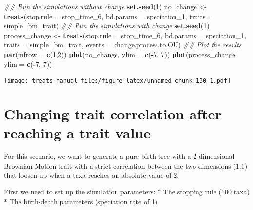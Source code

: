 \documentclass[
]{book}
\newenvironment{Shaded}{\begin{snugshade}}{\end{snugshade}}
\newcommand{\CommentTok}[1]{\textcolor[rgb]{0.56,0.35,0.01}{\textit{#1}}}
\newcommand{\DataTypeTok}[1]{\textcolor[rgb]{0.13,0.29,0.53}{#1}}
\newcommand{\DecValTok}[1]{\textcolor[rgb]{0.00,0.00,0.81}{#1}}
\newcommand{\KeywordTok}[1]{\textcolor[rgb]{0.13,0.29,0.53}{\textbf{#1}}}
\newcommand{\NormalTok}[1]{#1}
\newcommand{\OperatorTok}[1]{\textcolor[rgb]{0.81,0.36,0.00}{\textbf{#1}}}
\newcommand{\StringTok}[1]{\textcolor[rgb]{0.31,0.60,0.02}{#1}}
\begin{document}
\begin{Shaded}
\begin{Highlighting}[]
\CommentTok{\#\# Run the simulations without change}
\KeywordTok{set.seed}\NormalTok{(}\DecValTok{1}\NormalTok{)}
\NormalTok{no\_change \textless{}{-}}\StringTok{ }\KeywordTok{treats}\NormalTok{(}\DataTypeTok{stop.rule =}\NormalTok{ stop\_time\_}\DecValTok{6}\NormalTok{,}
                  \DataTypeTok{bd.params =}\NormalTok{ speciation\_}\DecValTok{1}\NormalTok{,}
                  \DataTypeTok{traits    =}\NormalTok{ simple\_bm\_trait)}
\CommentTok{\#\# Run the simulations with change}
\KeywordTok{set.seed}\NormalTok{(}\DecValTok{1}\NormalTok{)}
\NormalTok{process\_change \textless{}{-}}\StringTok{ }\KeywordTok{treats}\NormalTok{(}\DataTypeTok{stop.rule =}\NormalTok{ stop\_time\_}\DecValTok{6}\NormalTok{,}
                       \DataTypeTok{bd.params =}\NormalTok{ speciation\_}\DecValTok{1}\NormalTok{,}
                       \DataTypeTok{traits    =}\NormalTok{ simple\_bm\_trait,}
                       \DataTypeTok{events    =}\NormalTok{ change.process.to.OU)}
\CommentTok{\#\# Plot the results}
\KeywordTok{par}\NormalTok{(}\DataTypeTok{mfrow =} \KeywordTok{c}\NormalTok{(}\DecValTok{1}\NormalTok{,}\DecValTok{2}\NormalTok{))}
\KeywordTok{plot}\NormalTok{(no\_change, }\DataTypeTok{ylim =} \KeywordTok{c}\NormalTok{(}\OperatorTok{{-}}\DecValTok{7}\NormalTok{, }\DecValTok{7}\NormalTok{))}
\KeywordTok{plot}\NormalTok{(process\_change, }\DataTypeTok{ylim =} \KeywordTok{c}\NormalTok{(}\OperatorTok{{-}}\DecValTok{7}\NormalTok{, }\DecValTok{7}\NormalTok{))}
\end{Highlighting}
\end{Shaded}

\texttt{[image: treats\_manual\_files/figure-latex/unnamed-chunk-130-1.pdf]}

\hypertarget{EG_change_correlation}{%
\section{Changing trait correlation after reaching a trait value}\label{EG_change_correlation}}

For this scenario, we want to generate a pure birth tree with a 2 dimensional Brownian Motion trait with a strict correlation between the two dimensions (1:1) that loosen up when a taxa reaches an absolute value of 2.

First we need to set up the simulation parameters:
* The stopping rule (100 taxa)
* The birth-death parameters (speciation rate of 1)
\end{document}
